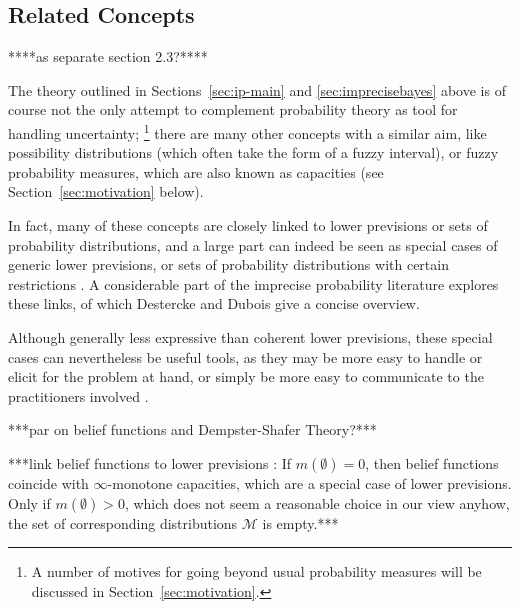 \subsection{Related Concepts}
\label{sec:ip-related}

****as separate section 2.3?****

The theory outlined in Sections~\ref{sec:ip-main} and \ref{sec:imprecisebayes} above
is of course not the only attempt to complement probability theory as tool for handling uncertainty;%
\footnote{A number of motives for going beyond usual probability measures will be discussed in Section~\ref{sec:motivation}.}
there are many other concepts with a similar aim,
like possibility distributions (which often take the form of a fuzzy interval),
or fuzzy probability measures, which are also known as capacities (see Section~\ref{sec:motivation} below).

In fact, many of these concepts are closely linked to
lower previsions or sets of probability distributions,
and a large part can indeed be seen as special cases of generic lower previsions, 
or sets of probability distributions with certain restrictions
\parencite[Fig.~5.5]{itip-special}.
A considerable part of the imprecise probability literature
explores these links, of which Destercke and Dubois \parencite*{itip-other,itip-special}
give a concise overview.


Although generally less expressive than coherent lower previsions,
these special cases can nevertheless be useful tools,
as they may be more easy to handle or elicit for the problem at hand,
or simply be more easy to communicate to the practitioners involved
\parencite[\S 1]{itip-special}.


***par on belief functions and Dempster-Shafer Theory?*** \parencite[\S 2]{itip-other}

***link belief functions to lower previsions \parencite[\S 2.1, p~126]{itip-other}:
If $m(\emptyset) = 0$, then belief functions coincide with $\infty$-monotone capacities,
which are a special case of lower previsions.
Only if $m(\emptyset) > 0$, which does not seem a reasonable choice in our view anyhow,
the set of corresponding distributions $\mathcal{M}$ is empty.***

